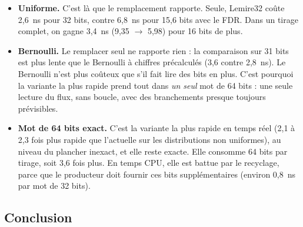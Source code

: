 \documentclass[11pt,a4paper]{article}
\begin{document}
\begin{itemize}
\item \textbf{Uniforme.} C'est là que le remplacement rapporte. Seule, Lemire32 coûte
  2,6~ns pour 32 bits, contre 6,8~ns pour 15,6 bits avec le FDR. Dans un tirage
  complet, on gagne 3,4~ns (9,35 $\to$ 5,98) pour 16 bits de plus.
\item \textbf{Bernoulli.} Le remplacer seul ne rapporte rien : la comparaison sur
  31 bits est plus lente que le Bernoulli à chiffres précalculés (3,6 contre 2,8~ns).
  Le Bernoulli n'est plus coûteux que s'il fait lire des bits en plus. C'est pourquoi la
  variante la plus rapide prend tout dans \emph{un seul} mot de 64 bits : une seule
  lecture du flux, sans boucle, avec des branchements presque toujours prévisibles.
\item \textbf{Mot de 64 bits exact.} C'est la variante la plus rapide en temps réel
  (2,1 à 2,3 fois plus rapide que l'actuelle sur les distributions non uniformes), au
  niveau du plancher inexact, et elle reste exacte. Elle consomme 64 bits par tirage,
  soit 3,6 fois plus. En temps CPU, elle est battue par le recyclage, parce que le
  producteur doit fournir ces bits supplémentaires (environ 0,8~ns par mot de
  32 bits).
\end{itemize}

\subsection{Conclusion}
\end{document}
